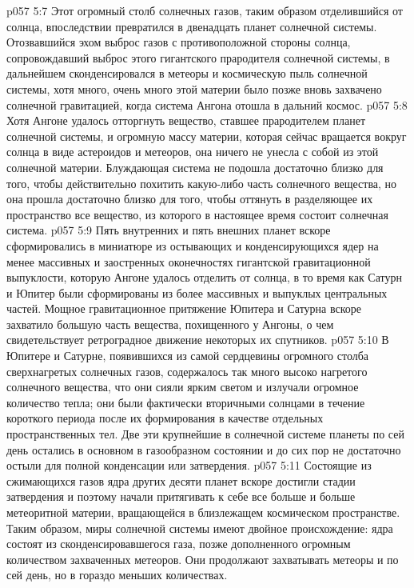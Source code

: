 \vs p057 5:7 Этот огромный столб солнечных газов, таким образом отделившийся от солнца, впоследствии превратился в двенадцать планет солнечной системы. Отозвавшийся эхом выброс газов с противоположной стороны солнца, сопровождавший выброс этого гигантского прародителя солнечной системы, в дальнейшем сконденсировался в метеоры и космическую пыль солнечной системы, хотя много, очень много этой материи было позже вновь захвачено солнечной гравитацией, когда система Ангона отошла в дальний космос.
\vs p057 5:8 Хотя Ангоне удалось отторгнуть вещество, ставшее прародителем планет солнечной системы, и огромную массу материи, которая сейчас вращается вокруг солнца в виде астероидов и метеоров, она ничего не унесла с собой из этой солнечной материи. Блуждающая система не подошла достаточно близко для того, чтобы действительно похитить какую\hyp{}либо часть солнечного вещества, но она прошла достаточно близко для того, чтобы оттянуть в разделяющее их пространство все вещество, из которого в настоящее время состоит солнечная система.
\vs p057 5:9 Пять внутренних и пять внешних планет вскоре сформировались в миниатюре из остывающих и конденсирующихся ядер на менее массивных и заостренных оконечностях гигантской гравитационной выпуклости, которую Ангоне удалось отделить от солнца, в то время как Сатурн и Юпитер были сформированы из более массивных и выпуклых центральных частей. Мощное гравитационное притяжение Юпитера и Сатурна вскоре захватило большую часть вещества, похищенного у Ангоны, о чем свидетельствует ретроградное движение некоторых их спутников.
\vs p057 5:10 В Юпитере и Сатурне, появившихся из самой сердцевины огромного столба сверхнагретых солнечных газов, содержалось так много высоко нагретого солнечного вещества, что они сияли ярким светом и излучали огромное количество тепла; они были фактически вторичными солнцами в течение короткого периода после их формирования в качестве отдельных пространственных тел. Две эти крупнейшие в солнечной системе планеты по сей день остались в основном в газообразном состоянии и до сих пор не достаточно остыли для полной конденсации или затвердения.
\vs p057 5:11 Состоящие из сжимающихся газов ядра других десяти планет вскоре достигли стадии затвердения и поэтому начали притягивать к себе все больше и больше метеоритной материи, вращающейся в близлежащем космическом пространстве. Таким образом, миры солнечной системы имеют двойное происхождение: ядра состоят из сконденсировавшегося газа, позже дополненного огромным количеством захваченных метеоров. Они продолжают захватывать метеоры и по сей день, но в гораздо меньших количествах.
